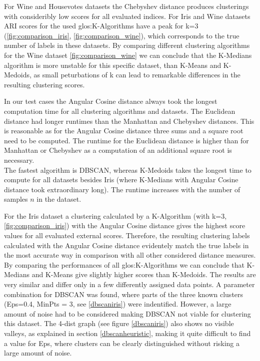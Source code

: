 For Wine and Housevotes datasets the Chebyshev distance produces clusterings with consideribly low scores for all evaluated indices. 
For Iris and Wine datasets ARI scores for the used \Gls{glos:K-Algorithms} have a peak for k=3 (\autoref{fig:comparison_iris}, \autoref{fig:comparison_wine}), which corresponds to the true number of labels in these datasets.  
By comparing different clustering algorithms for the Wine dataset \autoref{fig:comparison_wine} we can conclude that the K-Medians algorithm is more unstable for this specific dataset, than K-Means and K-Medoids, as small peturbations of k can lead to remarkable differences in the resulting clustering scores. 

In our test cases the Angular Cosine distance always took the longest computation time for all clustering algorithms and datasets. The Euclidean distance had longer runtimes than the Manhattan and Chebyshev distances. This is reasonable as for the Angular Cosine distance three sums and a square root need to be computed. The runtime for the Euclidean distance is higher than for Manhattan or Chebyshev as a computation of an additional square root is necessary.\\
The fastest algorithm is DBSCAN, whereas K-Medoids takes the longest time to compute for all datasets besides Iris (where K-Medians with Angular Cosine distance took extraordinary long). The runtime increases with the number of samples $n$ in the dataset. 

For the Iris dataset a clustering calculated by a K-Algorithm (with k=3, \autoref{fig:comparison_iris}) with the Angular Cosine distance gives the highest score values for all evaluated external scores. Therefore, the resulting clustering labels calculated with the Angular Cosine distance evidentely match the true labels in the most accurate way in comparison with all other considered distance measures. By comparing the performances of all \Gls{glos:K-Algorithms} we can conclude that K-Medians and K-Means give slightly higher scores than K-Medoids. The results are very similar and differ only in a few differently assigned data points.
A parameter combination for DBSCAN was found, where parts of the three known clusters (Eps=0.4, MinPts = 3, see \autoref{dbscaniris}) were indentified. However, a large amount of noise had to be considered making DBSCAN not viable for clustering this dataset. The 4-dist graph (see figure \autoref{dbscaniris}) also shows no visible valleys, as explained in section \ref{dbscanheuristic}, making it quite difficult to find a value for Eps, where clusters can be clearly distinguished without risking a large amount of noise.

